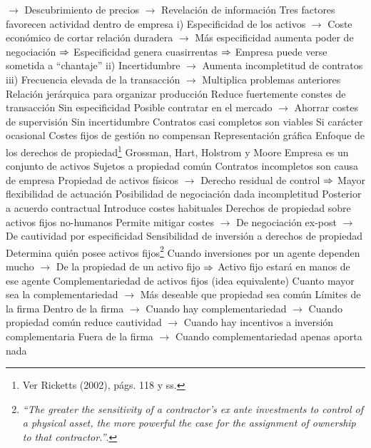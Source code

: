 \documentclass{nuevotema}
\begin{document}
\begin{esquemal}
				\4[] $\to$ Descubrimiento de precios
				\4[] $\to$ Revelación de información
				\4 Tres factores favorecen actividad dentro de empresa
				\4[] i) Especificidad de los activos
				\4[] $\to$ Coste económico de cortar relación duradera
				\4[] $\to$ Más especificidad aumenta poder de negociación
				\4[] $\Rightarrow$ Especificidad genera cuasirrentas
				\4[] $\Rightarrow$ Empresa puede verse sometida a ``chantaje''
				\4[] ii) Incertidumbre
				\4[] $\to$ Aumenta incompletitud de contratos
				\4[] iii) Frecuencia elevada de la transacción
				\4[] $\to$ Multiplica problemas anteriores
				\4 Relación jerárquica para organizar producción
				\4[] Reduce fuertemente constes de transacción
				\4 Sin especificidad
				\4[] Posible contratar en el mercado
				\4[] $\to$ Ahorrar costes de supervisión
				\4 Sin incertidumbre
				\4[] Contratos casi completos son viables
				\4 Si carácter ocasional
				\4[] Costes fijos de gestión no compensan
				\4 Representación gráfica
				\4[] 
			\3 Enfoque de los derechos de propiedad\footnote{Ver Ricketts (2002), págs. 118 y ss.}
				\4 Grossman, Hart, Holstrom y Moore
				\4 Empresa es un conjunto de activos
				\4[] Sujetos a propiedad común
				\4 Contratos incompletos son causa de empresa
				\4[] Propiedad de activos físicos
				\4[] $\to$ Derecho residual de control
				\4[] $\Rightarrow$ Mayor flexibilidad de actuación
				\4 Posibilidad de negociación dada incompletitud
				\4[] Posterior a acuerdo contractual
				\4[] Introduce costes habituales
				\4 Derechos de propiedad sobre activos fijos no-humanos
				\4[] Permite mitigar costes
				\4[] $\to$ De negociación ex-post
				\4[] $\to$ De cautividad por especificidad
				\4 Sensibilidad de inversión a derechos de propiedad
				\4[] Determina quién posee activos fijos\footnote{\textit{``The greater the sensitivity of a contractor’s ex ante investments to control of a physical asset, the more powerful the case for the assignment of ownership to that contractor.''}.}
				\4[] Cuando inversiones por un agente dependen mucho
				\4[] $\to$ De la propiedad de un activo fijo
				\4[] $\Rightarrow$ Activo fijo estará en manos de ese agente
				\4 Complementariedad de activos fijos (idea equivalente)
				\4[] Cuanto mayor sea la complementariedad
				\4[] $\to$ Más deseable que propiedad sea común
				\4 Límites de la firma
				\4[] Dentro de la firma
				\4[] $\to$ Cuando hay complementariedad
				\4[] $\to$ Cuando propiedad común reduce cautividad
				\4[] $\to$ Cuando hay incentivos a inversión complementaria
				\4[] Fuera de la firma
				\4[] $\to$ Cuando complementariedad apenas aporta nada

\end{esquemal}
\end{document}
